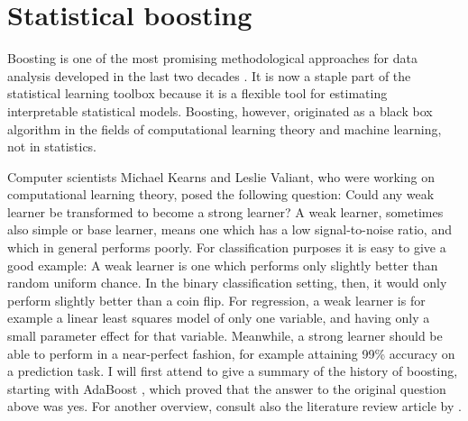 \chapter{Statistical boosting}
Boosting is one of the most promising methodological approaches for data analysis developed in the last two decades \citep{mayr14a}. It is now a staple part of the statistical learning toolbox because it is a flexible tool for estimating interpretable statistical models. Boosting, however, originated as a black box algorithm in the fields of computational learning theory and machine learning, not in statistics.

Computer scientists Michael Kearns and Leslie Valiant, who were working on computational learning theory, posed the following question: Could any weak learner be transformed to become a strong learner? \citep{kearnsvaliant} A weak learner, sometimes also simple or base learner, means one which has a low signal-to-noise ratio, and which in general performs poorly. For classification purposes it is easy to give a good example: A weak learner is one which performs only slightly better than random uniform chance. In the binary classification setting, then, it would only perform slightly better than a coin flip. For regression, a weak learner is for example a linear least squares model of only one variable, and having only a small parameter effect for that variable. Meanwhile, a strong learner should be able to perform in a near-perfect fashion, for example attaining 99\% accuracy on a prediction task. I will first attend to give a summary of the history of boosting, starting with AdaBoost \citep{adaboost}, which proved that the answer to the original question above was yes. For another overview, consult also the literature review article by \citet{mayr14a}.

